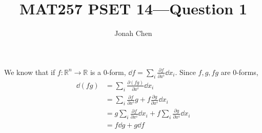 \documentclass{exam}
\title{MAT257 PSET 14---Question 1}
\author{Jonah Chen}
\date{}
\numberwithin{equation}{section}
\newcommand{\R}{\mathbb{R}}
\begin{document}
    \sffamily
    \maketitle
    We know that if \(f:\R^n\to\R\) is a 0-form, \(\dd f=\sum_i\frac{\partial f}{\partial x^i}\dd x_i\). Since \(f,g,fg\) are 0-forms,
    \begin{align*}
        \dd(fg)&=\sum_i\frac{\partial(fg)}{\partial x^i} \dd x_i\\
        &=\sum_i\frac{\partial f}{\partial x^i}g+f\frac{\partial g}{\partial x^i} \dd x_i\\
        &=g\sum_i\frac{\partial f}{\partial x^i} \dd x_i+f\sum_i\frac{\partial g}{\partial x^i} \dd x_i\\
        &=f\dd g + g\dd f
    \end{align*}
\end{document}
